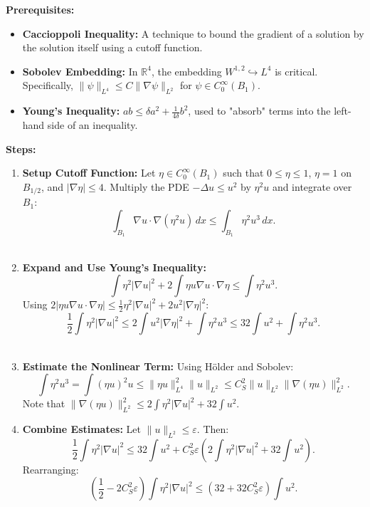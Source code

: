 \begin{solution}
\textbf{Prerequisites:} 
\begin{itemize}
    \item \textbf{Caccioppoli Inequality:} A technique to bound the gradient of a solution by the solution itself using a cutoff function.
    \item \textbf{Sobolev Embedding:} In $\mathbb{R}^4$, the embedding $W^{1,2} \hookrightarrow L^4$ is critical. Specifically, $\|\psi\|_{L^4} \leq C \|\nabla \psi\|_{L^2}$ for $\psi \in C_0^\infty(B_1)$.
    \item \textbf{Young's Inequality:} $ab \leq \delta a^2 + \frac{1}{4\delta} b^2$, used to "absorb" terms into the left-hand side of an inequality.
\end{itemize}

\bigskip

\textbf{Steps:}
\begin{enumerate}
    \item \textbf{Setup Cutoff Function:} Let $\eta \in C_0^\infty(B_1)$ such that $0 \leq \eta \leq 1$, $\eta = 1$ on $B_{1/2}$, and $|\nabla \eta| \leq 4$. Multiply the PDE $-\Delta u \leq u^2$ by $\eta^2 u$ and integrate over $B_1$:
    \[ \int_{B_1} \nabla u \cdot \nabla(\eta^2 u) \, dx \leq \int_{B_1} \eta^2 u^3 \, dx. \] \\[1em]

    \item \textbf{Expand and Use Young's Inequality:}
    \[ \int \eta^2 |\nabla u|^2 + 2 \int \eta u \nabla u \cdot \nabla \eta \leq \int \eta^2 u^3. \]
    Using $2|\eta u \nabla u \cdot \nabla \eta| \leq \frac{1}{2} \eta^2 |\nabla u|^2 + 2 u^2 |\nabla \eta|^2$:
    \[ \frac{1}{2} \int \eta^2 |\nabla u|^2 \leq 2 \int u^2 |\nabla \eta|^2 + \int \eta^2 u^3 \leq 32 \int u^2 + \int \eta^2 u^3. \] \\[1em]

    \item \textbf{Estimate the Nonlinear Term:} Using H\"older and Sobolev:
    \[ \int \eta^2 u^3 = \int (\eta u)^2 u \leq \|\eta u\|_{L^4}^2 \|u\|_{L^2} \leq C_S^2 \|u\|_{L^2} \|\nabla(\eta u)\|_{L^2}^2. \]
    Note that $\|\nabla(\eta u)\|_{L^2}^2 \leq 2 \int \eta^2 |\nabla u|^2 + 32 \int u^2$. \\[1em]

    \item \textbf{Combine Estimates:} Let $\|u\|_{L^2} \leq \varepsilon$. Then:
    \[ \frac{1}{2} \int \eta^2 |\nabla u|^2 \leq 32 \int u^2 + C_S^2 \varepsilon \left( 2 \int \eta^2 |\nabla u|^2 + 32 \int u^2 \right). \]
    Rearranging:
    \[ \left( \frac{1}{2} - 2 C_S^2 \varepsilon \right) \int \eta^2 |\nabla u|^2 \leq (32 + 32 C_S^2 \varepsilon) \int u^2. \] \\[1em]


\end{enumerate}
\end{solution}
